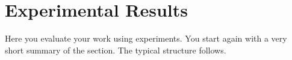 \documentclass[letterpaper]{article}
\begin{document}
	
	
	
	
	
	
	
	\section{Experimental Results}\label{sec:exp}
	
	Here you evaluate your work using experiments. You start again with a
	very short summary of the section. The typical structure follows.
	
\end{document}
